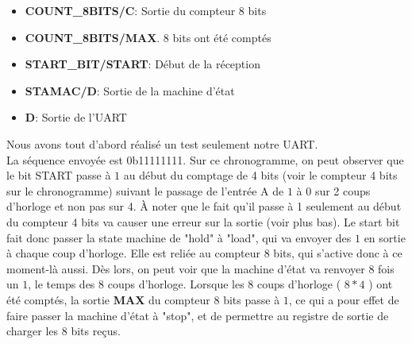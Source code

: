 \documentclass[a4paper]{article} %
\begin{document}
\begin{tcolorbox}[colframe=Monokaimagenta,colback=white]
\begin{itemize}
    \item     \textbf{COUNT\_8BITS/C}: Sortie du compteur 8 bits
    \item     \textbf{COUNT\_8BITS/MAX}. 8 bits ont été comptés
    \item     \textbf{START\_BIT/START}: Début de la réception
    \item     \textbf{STAMAC/D}: Sortie de la machine d'état
    \item     \textbf{D}: Sortie de l'UART
\end{itemize}
Nous avons tout d'abord réalisé un test seulement notre UART.\\
La séquence envoyée est 0b11111111. Sur ce chronogramme, on peut observer que le bit START passe à $1$ au début du comptage de 4 bits (voir le compteur 4 bits sur le chronogramme) suivant le passage de l'entrée A de $1$ à $0$ sur 2 coups d'horloge et non pas sur 4. À noter que le fait qu'il passe à 1 seulement au début du compteur 4 bits va causer une erreur sur la sortie (voir plus bas).
Le start bit fait donc passer la state machine de "hold" à "load", qui va envoyer des $1$ en sortie à chaque coup d'horloge. Elle est reliée au compteur 8 bits, qui s'active donc à ce moment-là aussi. Dès lors, on peut voir que la machine d'état va renvoyer 8 fois un $1$, le temps des 8 coups d'horloge. Lorsque les 8 coups d'horloge ( $8*4$ ) ont été comptés, la sortie \textbf{MAX} du compteur 8 bits passe à $1$, ce qui a pour effet de faire passer la machine d'état à "stop", et de permettre au registre de sortie de charger les 8 bits reçus.
\end{tcolorbox}
\end{document}
